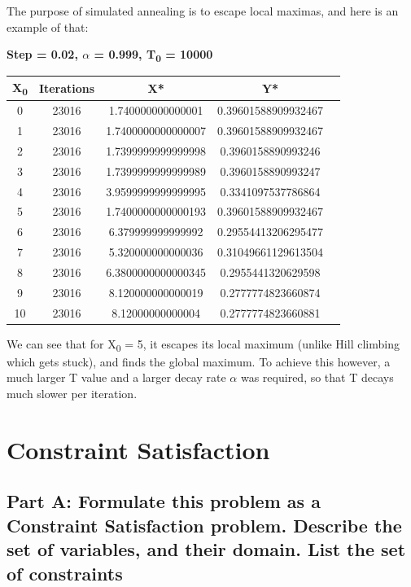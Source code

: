 \documentclass[paper=a4, fontsize=11pt]{scrartcl} %
\numberwithin{equation}{section} %
\numberwithin{figure}{section} %
\numberwithin{table}{section} %
\begin{document}
The purpose of simulated annealing is to escape local maximas, and here is an example of that:
\begin{center}
\textbf{Step = 0.02, \(\alpha\) = 0.999, T\textsubscript{0} = 10000 \\}
\begin{tabular}{ |c|c|c|c|c| } 
	\hline
	\textbf{X\textsubscript{0}} & \textbf{Iterations} & \textbf{X*} & \textbf{Y*} \\ 
	\hline
    0 & 23016 & 1.740000000000001 & 0.39601588909932467 \\
    1 & 23016 & 1.7400000000000007 & 0.39601588909932467 \\
    2 & 23016 & 1.7399999999999998 & 0.3960158890993246 \\
    3 & 23016 & 1.7399999999999989 & 0.3960158890993247 \\
    4 & 23016 & 3.9599999999999995 & 0.3341097537786864 \\
    5 & 23016 & 1.7400000000000193 & 0.39601588909932467 \\
    6 & 23016 & 6.379999999999992 & 0.29554413206295477 \\
    7 & 23016 & 5.320000000000036 & 0.31049661129613504 \\
    8 & 23016 & 6.3800000000000345 & 0.2955441320629598 \\
    9 & 23016 & 8.120000000000019 & 0.2777774823660874 \\
    10 & 23016 & 8.12000000000004 & 0.2777774823660881 \\
	\hline
\end{tabular}
\end{center}

We can see that for X\textsubscript{0} = 5, it escapes its local maximum (unlike Hill climbing which gets stuck), and finds the global maximum. To achieve this however, a much larger T value and a larger decay rate \(\alpha\) was required, so that T decays much slower per iteration. 

\section{Constraint Satisfaction}
\subsection{Part A: Formulate this problem as a Constraint Satisfaction problem. Describe the set of variables, and their domain.
List the set of constraints}
\end{document}
